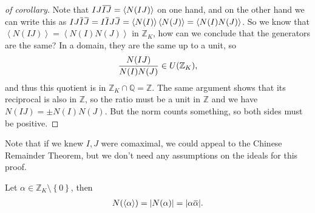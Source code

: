 \begin{proof}[of corollary]

Note that
\(IJ \mkern 1.5mu\overline{\mkern-1.5muIJ\mkern-1.5mu}\mkern 1.5mu = \left\langle{ N(IJ) }\right\rangle\)
on one hand, and on the other hand we can write this as
\(IJ \mkern 1.5mu\overline{\mkern-1.5muI\mkern-1.5mu}\mkern 1.5mu \mkern 1.5mu\overline{\mkern-1.5muJ\mkern-1.5mu}\mkern 1.5mu = I\mkern 1.5mu\overline{\mkern-1.5muI\mkern-1.5mu}\mkern 1.5mu J \mkern 1.5mu\overline{\mkern-1.5muJ\mkern-1.5mu}\mkern 1.5mu = \left\langle{ N(I) }\right\rangle \left\langle{ N(J) }\right\rangle = \left\langle{ N(I) N(J) }\right\rangle\).
So we know that
\(\left\langle{ N(IJ) }\right\rangle = \left\langle{ N(I) N(J) }\right\rangle\)
in \({\mathbb{Z}}_K\), how can we conclude that the generators are the
same? In a domain, they are the same up to a unit, so
\begin{align*}
{ N(IJ) \over N(I) N(J) } \in U({\mathbb{Z}}_K)
,\end{align*}
and thus this quotient is in
\({\mathbb{Z}}_K \cap{\mathbb{Q}}= {\mathbb{Z}}\). The same argument
shows that its reciprocal is also in \({\mathbb{Z}}\), so the ratio must
be a unit in \({\mathbb{Z}}\) and we have \(N(IJ) = \pm N(I) N(J)\). But
the norm counts something, so both sides must be positive.

\end{proof}

\begin{remark}

Note that if we knew \(I, J\) were comaximal, we could appeal to the
Chinese Remainder Theorem, but we don't need any assumptions on the
ideals for this proof.

\end{remark}

\begin{corollary}[?]

Let \(\alpha\in {\mathbb{Z}}_K \setminus\left\{{0}\right\}\), then
\begin{align*}
N( \left\langle{ \alpha }\right\rangle ) = {\left\lvert {N(\alpha)} \right\rvert}  = {\left\lvert {\alpha\mkern 1.5mu\overline{\mkern-1.5mu\alpha\mkern-1.5mu}\mkern 1.5mu} \right\rvert} 
.\end{align*}

\end{corollary}

